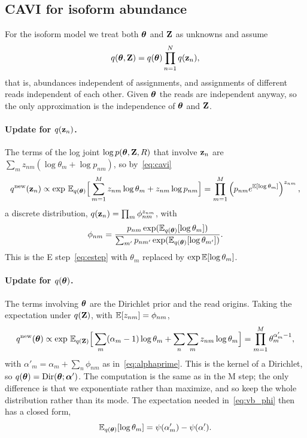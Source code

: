 \subsection{CAVI for isoform abundance}

For the isoform model we treat both $\boldsymbol{\theta}$ and $\mathbf{Z}$ as unknowns and assume
\begin{equation}
  q(\boldsymbol{\theta},\mathbf{Z}) = q(\boldsymbol{\theta})\prod_{n=1}^N q(\mathbf{z}_n),
\end{equation}
that is, abundances independent of assignments, and assignments of different reads independent of each other. Given $\boldsymbol{\theta}$ the reads are independent anyway, so the only approximation is the independence of $\boldsymbol{\theta}$ and $\mathbf{Z}$.

\paragraph{Update for $q(\mathbf{z}_n)$.} The terms of the log joint $\log p(\boldsymbol{\theta},\mathbf{Z},R)$ that involve $\mathbf{z}_n$ are $\sum_m z_{nm}(\log\theta_m+\log p_{nm})$, so by~\eqref{eq:cavi}
\begin{equation}
  q^{\text{new}}(\mathbf{z}_n) \propto \exp\,\mathbb{E}_{q(\boldsymbol{\theta})}\Big[\sum_{m=1}^M z_{nm}\log\theta_m + z_{nm}\log p_{nm}\Big] = \prod_{m=1}^M\left(p_{nm}e^{\mathbb{E}[\log\theta_m]}\right)^{z_{nm}},
\end{equation}
a discrete distribution, $q(\mathbf{z}_n)=\prod_m\phi_{nm}^{z_{nm}}$, with
\begin{equation}
  \phi_{nm} = \frac{p_{nm}\exp(\mathbb{E}_{q(\boldsymbol{\theta})}[\log\theta_m])}{\sum_{m'}p_{nm'}\exp(\mathbb{E}_{q(\boldsymbol{\theta})}[\log\theta_{m'}])} .
  \label{eq:vb_phi}
\end{equation}
This is the E step~\eqref{eq:estep} with $\theta_m$ replaced by $\exp\mathbb{E}[\log\theta_m]$.

\paragraph{Update for $q(\boldsymbol{\theta})$.} The terms involving $\boldsymbol{\theta}$ are the Dirichlet prior and the read origins. Taking the expectation under $q(\mathbf{Z})$, with $\mathbb{E}[z_{nm}]=\phi_{nm}$,
\begin{equation}
  q^{\text{new}}(\boldsymbol{\theta}) \propto \exp\,\mathbb{E}_{q(\mathbf{Z})}\Big[\sum_m(\alpha_m-1)\log\theta_m + \sum_n\sum_m z_{nm}\log\theta_m\Big] = \prod_{m=1}^M\theta_m^{\alpha'_m-1},
\end{equation}
with $\alpha'_m=\alpha_m+\sum_n\phi_{nm}$ as in~\eqref{eq:alphaprime}. This is the kernel of a Dirichlet, so $q(\boldsymbol{\theta})=\operatorname{Dir}(\boldsymbol{\theta};\boldsymbol{\alpha}')$. The computation is the same as in the M step; the only difference is that we exponentiate rather than maximize, and so keep the whole distribution rather than its mode. The expectation needed in~\eqref{eq:vb_phi} then has a closed form,
\begin{equation}
  \mathbb{E}_{q(\boldsymbol{\theta})}[\log\theta_m] = \psi(\alpha'_m) - \psi(\alpha'_\cdot).
\end{equation}

